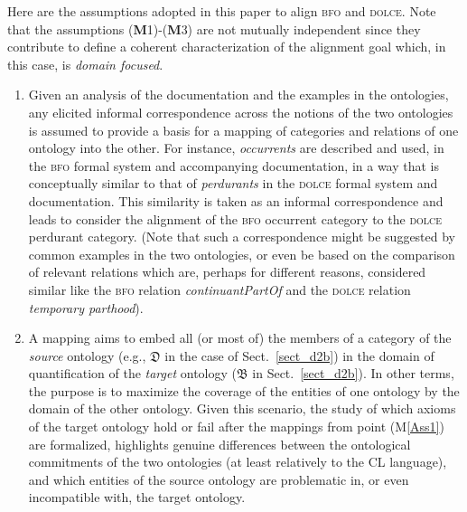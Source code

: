\documentclass[ao]{iosart2x}
\newcommand{\nb}[1]{\textcolor{red}{$|$}\marginpar{\hspace*{-0cm}\parbox{20mm}{\scriptsize\raggedright\textcolor{red}{#1}}}}
\newcommand{\dolce}{{\textsc{dolce}}}
\newcommand{\bfo}{{\textsc{bfo}}}
\newcommand {\thdolce} {\ensuremath{\mathfrak{D}}}
\newcommand {\thbfo} {\ensuremath{\mathfrak{B}}}
\begin{document}
Here are the assumptions %
adopted in this paper to align {\bfo} and {\dolce}. Note that the assumptions ({\bf M}1)-({\bf M}3) are not mutually independent since they contribute to define a coherent characterization of the alignment goal which, in this case, is {\em domain focused}. 
%
\begin{enumerate}[({\bf M}1)]
\item \label{Ass1} %
Given an analysis of the documentation and the examples in the ontologies, any elicited informal correspondence across the notions of the two ontologies 
is assumed to provide a basis for a mapping of categories and relations of one ontology into the other. 
For instance, \emph{occurrents} 
are described and used, in the {\bfo} formal system and accompanying documentation, in a way that is conceptually similar to that of \emph{perdurants} in the {\dolce} formal system and documentation.
This similarity is taken as an informal correspondence and leads to consider the alignment of the {\bfo} occurrent category to the {\dolce} perdurant category. (Note that such a correspondence might be suggested by common examples in the two ontologies, or even be based on the comparison of relevant relations which are, perhaps for different reasons, considered similar like the {\bfo} relation \emph{continuantPartOf} and the {\dolce} relation \emph{temporary parthood}). 

\item \label{Ass2} A mapping aims to %
embed all (or most of) the members of a category of the \emph{source} ontology (e.g., {$\thdolce$} in the case of Sect.~\ref{sect_d2b}) in the domain of quantification of the \emph{target} ontology ({$\thbfo$} in Sect.~\ref{sect_d2b}). In other terms, the purpose is to maximize the coverage of the entities of one ontology by the domain of the other ontology. 
Given this scenario, the study of which axioms of the target ontology hold or fail after the mappings from point (M\ref{Ass1}) are formalized, highlights genuine differences between the ontological commitments of the two ontologies (at least relatively to the CL language), and which entities of the source ontology are problematic in, or even incompatible with, the target ontology.   


\end{enumerate}
\end{document}
